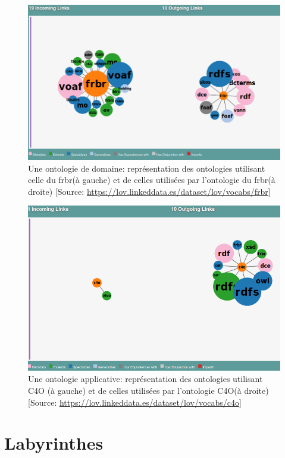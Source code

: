 \begin{figure}[!h]
	\centering
	\includegraphics[width=14cm]{images/onto_frbr.png}
	\caption[Une ontologie de domaine: FRBR]{Une ontologie de domaine: représentation des ontologies utilisant celle du \ac{frbr}(à gauche) et de celles utilisées par l'ontologie du \ac{frbr}(à droite) [Source: \url{https://lov.linkeddata.es/dataset/lov/vocabs/frbr}]}
	\label{onto_frbr}
\end{figure}

\begin{figure}[!h]
	\centering
	\includegraphics[width=14cm]{images/onto_c4o.png}
	\caption[Une ontologie applicative: C4O]{Une ontologie applicative: représentation des ontologies utilisant C4O (à gauche) et de celles utilisées par l'ontologie C4O(à droite) [Source: \url{https://lov.linkeddata.es/dataset/lov/vocabs/c4o}]}
	\label{onto_c4o}
\end{figure}

\chapter{\label{annexe_laby}Labyrinthes}


